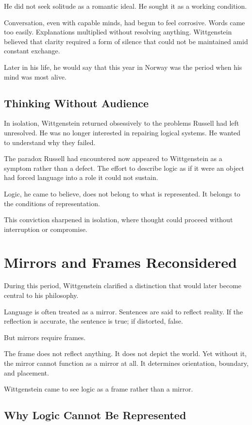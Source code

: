 \documentclass[11pt]{article}
\begin{document}
He did not seek solitude as a romantic ideal. He sought it as a working condition.

Conversation, even with capable minds, had begun to feel corrosive. Words came too easily. Explanations multiplied without resolving anything. Wittgenstein believed that clarity required a form of silence that could not be maintained amid constant exchange.

Later in his life, he would say that this year in Norway was the period when his mind was most alive.

\subsection*{Thinking Without Audience}

In isolation, Wittgenstein returned obsessively to the problems Russell had left unresolved. He was no longer interested in repairing logical systems. He wanted to understand why they failed.

The paradox Russell had encountered now appeared to Wittgenstein as a symptom rather than a defect. The effort to describe logic as if it were an object had forced language into a role it could not sustain.

Logic, he came to believe, does not belong to what is represented. It belongs to the conditions of representation.

This conviction sharpened in isolation, where thought could proceed without interruption or compromise.

\section*{Mirrors and Frames Reconsidered}

During this period, Wittgenstein clarified a distinction that would later become central to his philosophy.

Language is often treated as a mirror. Sentences are said to reflect reality. If the reflection is accurate, the sentence is true; if distorted, false.

But mirrors require frames.

The frame does not reflect anything. It does not depict the world. Yet without it, the mirror cannot function as a mirror at all. It determines orientation, boundary, and placement.

Wittgenstein came to see logic as a frame rather than a mirror.

\subsection*{Why Logic Cannot Be Represented}
\end{document}
